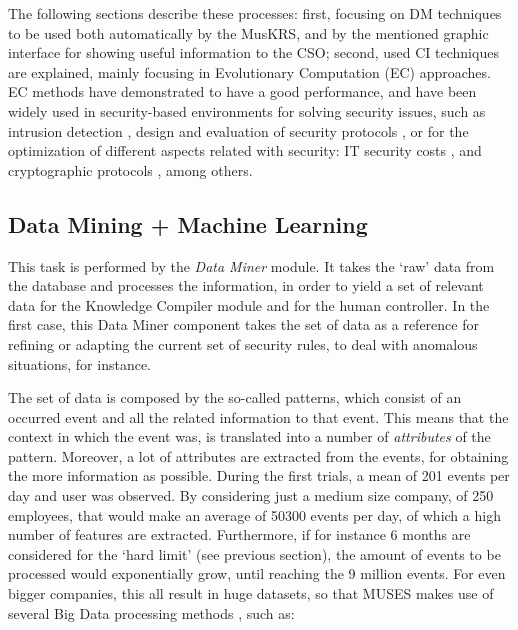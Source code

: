 The following sections describe these processes: first, focusing on DM techniques to be used both automatically by the MusKRS, and by the mentioned graphic interface for showing useful information to the CSO; second, used CI techniques are explained, mainly focusing in Evolutionary Computation (EC) \cite{EAs_Back96} approaches. EC methods have demonstrated to have a good performance, and have been widely used in security-based environments for solving security issues, such as intrusion detection \cite{GA_intrusion-majeed}, design and evaluation of security protocols \cite{GP_intrusion-lu,GA_networksecurity-zarza}, or for the optimization of different aspects related with security: IT security costs \cite{EAs_securitycosts-kirta}, and cryptographic protocols \cite{GA_cryptographicprotocols-zarza2}, among others.

%
\subsection{Data Mining + Machine Learning}
\label{subsubsec:dm_ml}

This task is performed by the \textit{Data Miner} module. It  takes the `raw' data from the database and processes the information, in order to yield a set of relevant data for the Knowledge Compiler module and for the human controller. In the first case, this Data Miner component takes the set of data as a reference for refining or adapting the current set of security rules, to deal with anomalous situations, for instance.

The set of data is composed by the so-called patterns, which consist of an occurred event 
and all the related information to that event. This means that the context in which the event was, is translated into a number of \textit{attributes} of the pattern. 
Moreover, a lot of attributes are extracted from the events, for obtaining the more information as possible. 
During the first trials, a mean of 201 events per day and user was observed. By considering just a medium size company, of 250 employees, that would make an average of 50300 events per day, of which a high number of features are extracted. Furthermore, if for instance 6 months are considered for the `hard limit' (see previous section), the amount of events to be processed would exponentially grow, until reaching the 9 million events. For even bigger companies, this all result in huge datasets, so that MUSES makes use of several Big Data processing methods \cite{BigData_11}, such as: 

